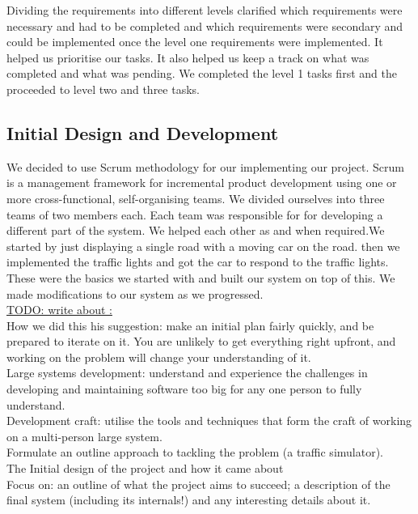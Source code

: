 \documentclass{article}[11pt,Tahoma]
\begin{document}
			 Dividing the requirements into different levels clarified which requirements were necessary and had to be completed and which requirements were secondary and could be implemented once the level one requirements were implemented. It helped us prioritise our tasks. It also helped us keep a track on what was completed and what was pending. We completed the level 1 tasks first and the proceeded to level two and three tasks. 	 
		 \subsection{Initial Design and Development}
		  	We decided to use Scrum methodology for our implementing our project. Scrum is a management framework for incremental product development using one or more cross-functional, self-organising teams. We divided ourselves into three teams of two members each. Each team was responsible for for developing a different part of the system. We helped each other as and when required.We started by just displaying a single road with a moving car on the road. then we implemented the traffic lights and got the car to respond to the traffic lights. These were the basics we started with and built our system on top of this. We made modifications to our system as we progressed. \\
		 
		 \underline{ TODO: write about :}\\
		 	How we did this his suggestion: make an initial plan fairly quickly, and be prepared to iterate on it. You are unlikely to get everything right upfront, and working on the problem will change your understanding of it.\\
		 
			Large systems development: understand and experience the challenges in developing and maintaining software too big for any one person to fully understand.\\
		 
		 	Development craft: utilise the tools and techniques that form the craft of working on a multi-person large system.\\
		 
		 	Formulate an outline approach to tackling the problem (a traffic simulator). \\
		 
		 	The Initial design of the project and how it came about\\
		 
		 	Focus on: an outline of what the project aims to succeed; a description of the final system (including its internals!) and any interesting details about it.
\end{document}
